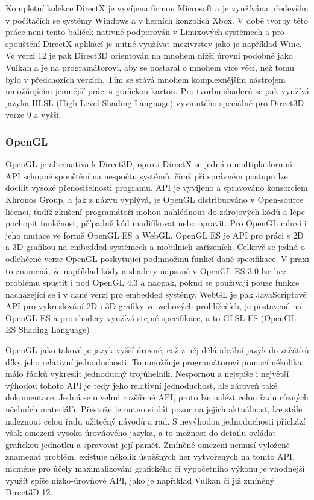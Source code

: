 Kompletní kolekce DirectX je vyvíjena firmou Microsoft a je využívána především v počítačích se systémy Windows a v herních konzolích Xbox. V době tvorby této práce není tento balíček nativně podporován v Linuxových systémech a pro spouštění DirectX aplikací je nutné využívat mezivrstev jako je například Wine. Ve verzi 12 je pak Direct3D orientován na mnohem nižší úrovni podobně jako Vulkan a je na programátorovi, aby se postaral o mnohem více věcí, než tomu bylo v předchozích verzích. Tím se stává mnohem komplexnějším nástrojem umožňujícím jemnější práci s grafickou kartou. Pro tvorbu shaderů se pak využívá jazyka HLSL (High-Level Shading Language) vyvinutého speciálně pro Direct3D verze 9 a vyšší.
\subsubsection{OpenGL}
OpenGL je alternativa k Direct3D, oproti DirectX se jedná o multiplatformní API schopné spouštění na nespočtu systémů, čímž při správném postupu lze docílit vysoké přenositelnosti programu. API je vyvíjeno a spravováno konsorciem Khronos Group, a jak z názvu vyplývá, je OpenGL distribuováno v Open-source licenci, tudíž zkušení programátoři mohou nahlédnout do zdrojových kódů a lépe pochopit funkčnost, případně kód modifikovat nebo opravit. Pro OpenGL mluví i jeho mutace ve formě OpenGL ES a WebGL. OpenGL ES je API pro práci s 2D a 3D grafikou na embedded systémech a mobilních zařízeních. Celkově se jedná o odlehčené verze OpenGL poskytující podmnožinu funkcí dané specifikace. V praxi to znamená, že například kódy a shadery napsané v OpenGL ES 3.0 lze bez problému spustit i pod OpenGL 4.3 a naopak, pokud se používají pouze funkce nacházející se i v dané verzi pro embedded systémy. WebGL je pak JavaScriptové API pro vykreslování 2D i 3D grafiky ve webových prohlížečích, je postavené na OpenGL ES a pro shadery využívá stejné specifikace, a to GLSL ES (OpenGL ES Shading Language)

OpenGL jako takové je jazyk vyšší úrovně, což z něj dělá ideální jazyk do začátků díky jeho relativní jednoduchosti. To umožňuje programátorovi pomocí několika málo řádků vykreslit jednoduchý trojúhelník. Nespornou a nejspíše i největší výhodou tohoto API je tedy jeho relativní jednoduchost, ale zároveň také dokumentace. Jedná se o velmi rozšířené API, proto lze nalézt celou řadu různých učebních materiálů. Přestože je nutno si dát pozor na jejich aktuálnost, lze stále naleznout celou řadu užitečný návodů a rad. S nevýhodou jednoduchosti přichází však omezení vysoko-úrovňového jazyka, a to možnost do detailu ovládat grafickou jednotku a spravovat její paměť. Zmíněné omezení nemusí vyloženě znamenat problém, existuje několik úspěšných her vytvořených na tomto API, nicméně pro účely maximalizování grafického či výpočetního výkonu je vhodnější využít spíše nízko-úrovňové API, jako je například Vulkan či již zmíněný Direct3D 12.


